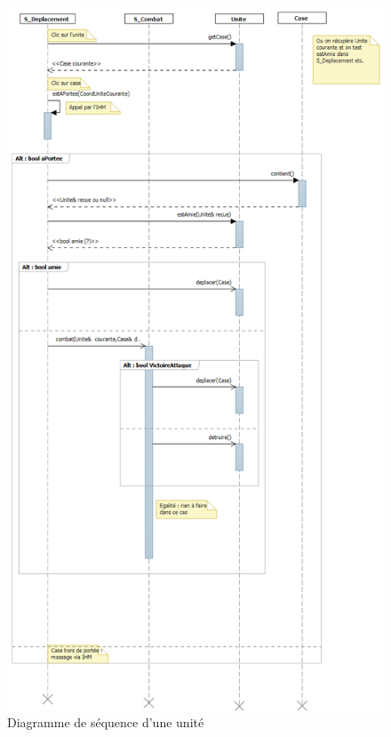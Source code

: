 \documentclass[a4paper]{article}%
\begin{document}
\begin{figure}[H]
    \centering
    \includegraphics[width=\textwidth]{./images/sequence/DiagSeqUtilisationUnite.png}
                \caption{Diagramme de séquence d'une unité}
                \label{fig:sequence_unité}
\end{figure}

\newpage
\end{document}
